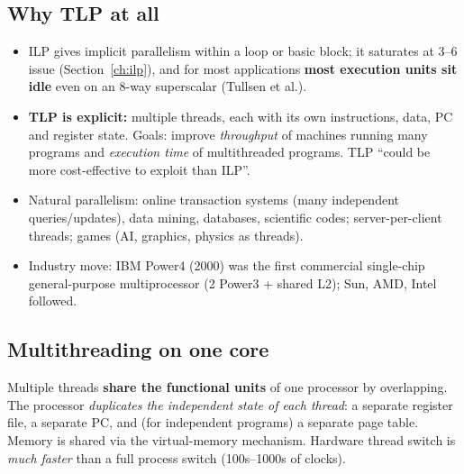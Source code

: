 \subsection{Why TLP at all}
\begin{itemize}
\item ILP gives implicit parallelism within a loop or basic block; it saturates at 3--6 issue (Section~\ref{ch:ilp}), and for most applications \textbf{most execution units sit idle} even on an 8-way superscalar (Tullsen et al.).
\item \textbf{TLP is explicit:} multiple threads, each with its own instructions, data, PC and register state. Goals: improve \emph{throughput} of machines running many programs and \emph{execution time} of multithreaded programs. TLP ``could be more cost-effective to exploit than ILP''.
\item Natural parallelism: online transaction systems (many independent queries/updates), data mining, databases, scientific codes; server-per-client threads; games (AI, graphics, physics as threads).
\item Industry move: IBM Power4 (2000) was the first commercial single-chip general-purpose multiprocessor (2 Power3 + shared L2); Sun, AMD, Intel followed.
\end{itemize}

\subsection{Multithreading on one core}
Multiple threads \textbf{share the functional units} of one processor by overlapping. The processor \emph{duplicates the independent state of each thread}: a separate register file, a separate PC, and (for independent programs) a separate page table. Memory is shared via the virtual-memory mechanism. Hardware thread switch is \emph{much faster} than a full process switch (100s--1000s of clocks).

